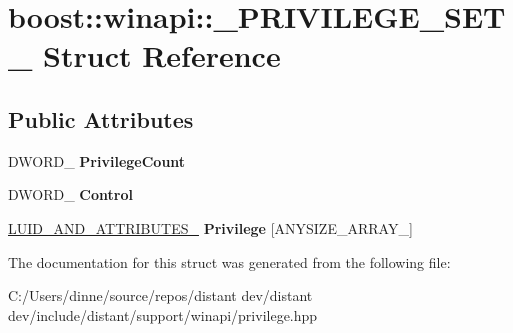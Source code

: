 \hypertarget{structboost_1_1winapi_1_1___p_r_i_v_i_l_e_g_e___s_e_t__}{}\section{boost\+:\+:winapi\+:\+:\+\_\+\+P\+R\+I\+V\+I\+L\+E\+G\+E\+\_\+\+S\+E\+T\+\_\+ Struct Reference}
\label{structboost_1_1winapi_1_1___p_r_i_v_i_l_e_g_e___s_e_t__}
\subsection*{Public Attributes}
\begin{DoxyCompactItemize}
\item 
\mbox{\label{structboost_1_1winapi_1_1___p_r_i_v_i_l_e_g_e___s_e_t___abe4f7025b2195849d658fec8a92d13de}} 
D\+W\+O\+R\+D\+\_\+ {\bfseries Privilege\+Count}
\item 
\mbox{\label{structboost_1_1winapi_1_1___p_r_i_v_i_l_e_g_e___s_e_t___aa0d82b875e5514e615669140eaa3d6b3}} 
D\+W\+O\+R\+D\+\_\+ {\bfseries Control}
\item 
\mbox{\label{structboost_1_1winapi_1_1___p_r_i_v_i_l_e_g_e___s_e_t___aeb1b17e66c42a8607ff6457ab9f7504f}} 
\mbox{\hyperlink{structboost_1_1winapi_1_1___l_u_i_d___a_n_d___a_t_t_r_i_b_u_t_e_s__}{L\+U\+I\+D\+\_\+\+A\+N\+D\+\_\+\+A\+T\+T\+R\+I\+B\+U\+T\+E\+S\+\_\+}} {\bfseries Privilege} \mbox{[}A\+N\+Y\+S\+I\+Z\+E\+\_\+\+A\+R\+R\+A\+Y\+\_\+\mbox{]}
\end{DoxyCompactItemize}


The documentation for this struct was generated from the following file\+:\begin{DoxyCompactItemize}
\item 
C\+:/\+Users/dinne/source/repos/distant dev/distant dev/include/distant/support/winapi/privilege.\+hpp\end{DoxyCompactItemize}
